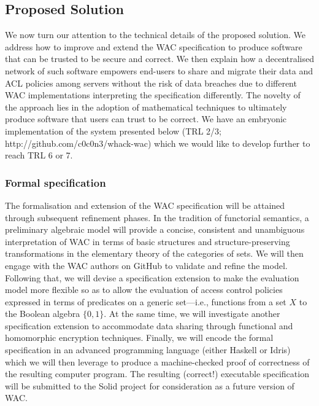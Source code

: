 \subsection{Proposed Solution}

We now turn our attention to the technical details of the proposed
solution. We address how to improve and extend the WAC specification
to produce software that can be trusted to be secure and correct. We
then explain how a decentralised network of such software empowers
end-users to share and migrate their data and ACL policies among
servers without the risk of data breaches due to different WAC
implementations interpreting the specification differently.
The novelty of the approach lies in the adoption of mathematical
techniques to ultimately produce software that users can trust
to be correct. We have an embryonic implementation of the system
presented below (TRL 2/3; http://github.com/c0c0n3/whack-wac) which
we would like to develop further to reach TRL 6 or 7.


\subsubsection{Formal specification}
The formalisation and extension of the WAC specification will be
attained through subsequent refinement phases. In the tradition of
functorial semantics\cite{lawvere1963functorial, bonchi2017functorial},
a preliminary algebraic model will provide a concise, consistent and
unambiguous interpretation of WAC in terms of basic structures and
structure-preserving transformations in the elementary theory of the
categories of sets\cite{lawvere1964elementary, leinster2014rethinking}.
We will then engage with the WAC authors on GitHub to validate and
refine the model. Following that, we will devise a specification extension
to make the evaluation model more flexible so as to allow the evaluation
of access control policies expressed in terms of predicates on a generic
set---i.e., functions from a set $X$ to the Boolean algebra $\{0,1\}$.
At the same time, we will investigate another specification extension
to accommodate data sharing through functional\cite{boneh2011functional}
and homomorphic\cite{gentry2009fully} encryption techniques. Finally,
we will encode the formal specification in an advanced programming
language (either Haskell\cite{peytonjones:h98} or Idris\cite{brady2013idris})
which we will then leverage to produce a machine-checked proof of
correctness of the resulting computer program. The resulting (correct!)
executable specification will be submitted to the Solid project for
consideration as a future version of WAC.

